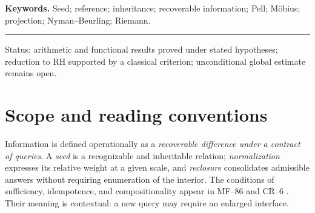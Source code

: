 \documentclass[11pt,a4paper]{article}
\theoremstyle{mine}
\theoremstyle{definition}
\newcommand{\WW}{\mathcal W}
\newcommand{\RH}{\mathrm{RH}}
\begin{document}
\textbf{Keywords.} Seed; reference; inheritance; recoverable information; Pell; M\"obius; projection; Nyman--Beurling; Riemann.
\vspace{6pt}
\begin{center}
\end{center}
\vfill
\rule{\linewidth}{.5pt}
{\footnotesize\color{Faint}Status: arithmetic and functional results proved under stated hypotheses; reduction to RH supported by a classical criterion; unconditional global estimate remains open.}\newpage

\section{Scope and reading conventions}

Information is defined operationally as a \emph{recoverable difference under a contract of queries}. A \emph{seed} is a recognizable and inheritable relation; \emph{normalization} expresses its relative weight at a given scale, and \emph{reclosure} consolidates admissible answers without requiring enumeration of the interior. The conditions of sufficiency, idempotence, and compositionality appear in MF--86 and CR--6 \cite{MF86,CR6}. Their meaning is contextual: a new query may require an enlarged interface.
\end{document}
